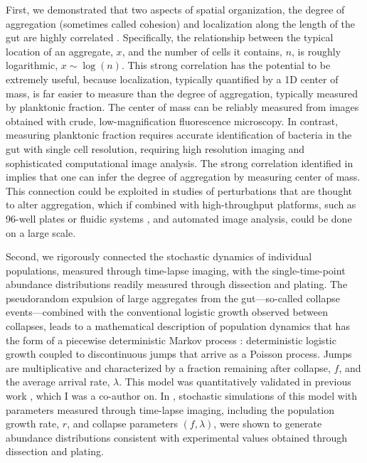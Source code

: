 First, we demonstrated that two aspects of spatial organization, the degree of aggregation (sometimes called cohesion) and localization along the length of the gut are highly correlated \cite{schlomann_bacterial_2018}. Specifically, the relationship between the typical location of an aggregate, $x$, and the number of cells it contains, $n$, is roughly logarithmic, $x \sim \log(n)$. This strong correlation has the potential to be extremely useful, because localization, typically quantified by a 1D center of mass, is far easier to measure than the degree of aggregation, typically measured by planktonic fraction. The center of mass can be reliably measured from images obtained with crude, low-magnification fluorescence microscopy. In contrast, measuring planktonic fraction requires accurate identification of bacteria in the gut with single cell resolution, requiring high resolution imaging and sophisticated computational image analysis. The strong correlation identified in \cite{schlomann_bacterial_2018} implies that one can infer the degree of aggregation by measuring center of mass. This connection could be exploited in studies of perturbations that are thought to alter aggregation, which if combined with high-throughput platforms, such as 96-well plates or fluidic systems \cite{logan2018automated}, and automated image analysis, could be done on a large scale.

Second, we rigorously connected the stochastic dynamics of individual populations, measured through time-lapse imaging, with the single-time-point abundance distributions readily measured through dissection and plating. The pseudorandom expulsion of large aggregates from the gut---so-called collapse events---combined with the conventional logistic growth observed between collapses, leads to a mathematical description of population dynamics that has the form of a piecewise deterministic Markov process \cite{hansonBook}: deterministic logistic growth coupled to discontinuous jumps that arrive as a Poisson process. Jumps are multiplicative and characterized by a fraction remaining after collapse, $f$, and the average arrival rate, $\lambda$. This model was quantitatively validated in previous work \cite{wiles_host_2016}, which I was a co-author on. In \cite{wiles_host_2016}, stochastic simulations of this model with parameters measured through time-lapse imaging, including the population growth rate, $r$, and collapse parameters $(f, \lambda)$, were shown to generate abundance distributions consistent with experimental values obtained through dissection and plating. 

